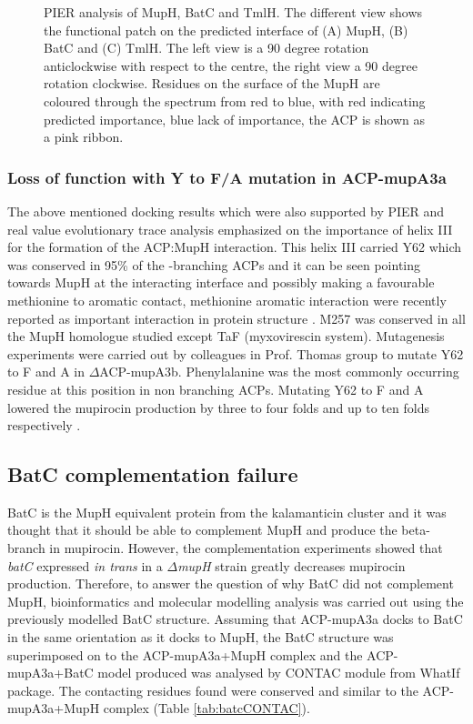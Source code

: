 			\setlength\fboxsep{5pt}
			\setlength\fboxrule{1.5pt}
			\begin{figure} [!]
			\centering
			\caption[PIER analysis of MupH, BatC and TmlH.]{PIER analysis of MupH, BatC and TmlH. The different view shows the functional patch on the predicted interface of (A) MupH, (B) BatC and (C) TmlH. The left view is a 90 degree rotation anticlockwise with respect to the centre, the right view a 90 degree rotation clockwise. Residues on the surface of the MupH are coloured through the spectrum from red to blue, with red indicating predicted importance, blue lack of importance, the ACP is shown as a pink ribbon.}
			\label{fig:PIER}
			\end{figure}

		\subsubsection{Loss of function with Y to F/A mutation in ACP-mupA3a}
		\label{sec:lossoffunc}
		The above mentioned docking results which were also supported by PIER and real value evolutionary trace analysis emphasized on the importance of helix III for the formation of the ACP:MupH interaction. This helix III carried Y62 which was conserved in 95\% of the \bet-branching ACPs and it can be seen pointing towards MupH at the interacting interface and possibly making a favourable methionine to aromatic contact, methionine aromatic interaction were recently reported as important interaction in protein structure \parencite{Valley2012}. M257 was conserved in all the MupH homologue studied except TaF (myxovirescin system). Mutagenesis experiments were carried out by colleagues in Prof. Thomas group to mutate Y62 to F and A in $ \Delta $ACP-mupA3b. Phenylalanine was the most commonly occurring residue at this position in non branching ACPs. Mutating Y62 to F and A lowered the mupirocin production by three to four folds and up to ten folds respectively \parencite{Haines2013}. 
	
	\subsection{BatC complementation failure}
	\label{sec:batccomplement}
	BatC is the MupH equivalent protein from the kalamanticin cluster and it was thought that it should be able to complement MupH and produce the beta-branch in mupirocin. However, the complementation experiments showed that \textit{batC} expressed \textit{in trans} in a $ \Delta $\textit{mupH} strain greatly decreases mupirocin production. Therefore, to answer the question of why BatC did not complement MupH, bioinformatics and molecular modelling analysis was carried out using the previously modelled BatC structure. Assuming that ACP-mupA3a docks to BatC in the same orientation as it docks to MupH, the BatC structure was superimposed on to the ACP-mupA3a+MupH complex and the ACP-mupA3a+BatC model produced was analysed by CONTAC module from WhatIf package. The contacting residues found were conserved and similar to the ACP-mupA3a+MupH complex (Table \ref{tab:batcCONTAC}). 
	
